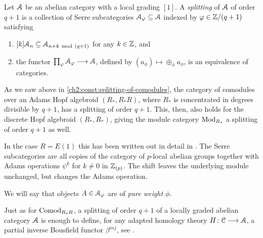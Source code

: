 \begin{definition}
    \label{ch2:def:splitting-of-abelian-category}
    Let $\EuScript{A}$ be an abelian category with a local grading $[1]$. A \emph{splitting} of $\EuScript{A}$ of order $q+1$ is a collection of Serre subcategories $\EuScript{A}_\varphi \subseteq \EuScript{A}$ indexed by $\varphi \in \mathbb{Z}/(q+1)$ satisfying
    \begin{enumerate}
        \item $[k]\EuScript{A}_n \subseteq \EuScript{A}_{n+k ~\mathrm{mod}~ (q+1)}$ for any $k\in \mathbb{Z}$, and 
        \item the functor $\prod_{\varphi}\EuScript{A}_\varphi\longrightarrow \EuScript{A}$, defined by $(a_\phi)\mapsto \oplus_\phi a_\phi$, is an equivalence of categories. 
    \end{enumerate}
\end{definition}
    
\begin{example}
    \label{ch2:ex:splitting-modules}
    As we saw above in \cref{ch2:const:splitting-of-comodules}, the category of comodules over an Adams Hopf algebroid $(R_*, R_*R)$, where $R_*$ is concentrated in degrees divisible by $q+1$, has a splitting of order $q+1$. This, then, also holds for the discrete Hopf algebroid $(R_*, R_*)$, giving the module category $\mathrm{Mod}_{R_*}$ a splitting of order $q+1$ as well. 
\end{example}

\begin{example}
    In the case $R=E(1)$ this has been written out in detail in \cite[Section 4]{barnes-roitzheim_2011}. The Serre subcategories are all copies of the category of $p$-local abelian groups together with Adams operations $\psi^k$ for $k\neq 0$ in $\mathbb{Z}_{(p)}$. The shift leaves the underlying module unchanged, but changes the Adams operation. 
\end{example}
    
\begin{definition}
    \label{ch2:not:pure-weight}
    We will say that objects $A\in \EuScript{A}_\varphi$ are of \emph{pure weight $\phi$}. 
\end{definition}
    
\begin{remark}
    Just as for $\mathrm{Comod}_{R_*R}$, a splitting of order $q+1$ of a locally graded abelian category $\EuScript{A}$ is enough to define, for any adapted homology theory $H\colon \EuScript{C}\longrightarrow \EuScript{A}$, a partial inverse Bousfield functor $\beta^{inj}$, see \cite[Section 7.2]{patchkoria-pstragowski_2021}. 
\end{remark}




